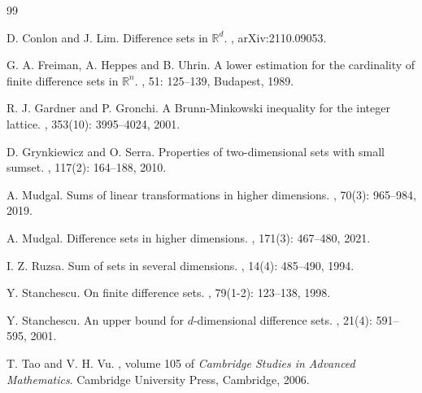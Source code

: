 \begin{thebibliography}{99}


D. Conlon and J. Lim.
\newblock Difference sets in $\mathbb{R}^d$.
, arXiv:2110.09053.


G. A. Freiman, A. Heppes and B. Uhrin.
\newblock A lower estimation for the cardinality of finite difference sets in $\mathbb{R}^n$.
, 51: 125--139, Budapest, 1989.


R. J. Gardner and P. Gronchi.
\newblock A Brunn-Minkowski inequality for the integer lattice.
, 353(10): 3995--4024, 2001.


D. Grynkiewicz and O. Serra.
\newblock Properties of two-dimensional sets with small sumset.
, 117(2): 164--188, 2010.


A. Mudgal.
\newblock Sums of linear transformations in higher dimensions.
, 70(3): 965--984, 2019.


A. Mudgal.
\newblock Difference sets in higher dimensions.
, 171(3): 467--480, 2021.


 I. Z. Ruzsa.
\newblock Sum of sets in several dimensions.
, 14(4): 485--490, 1994.


Y. Stanchescu.
\newblock On finite difference sets.
, 79(1-2): 123--138, 1998.


Y. Stanchescu.
\newblock An upper bound for $d$-dimensional difference sets.
, 21(4): 591--595, 2001.


T. Tao and V. H. Vu.
, volume 105 of {\em Cambridge Studies in Advanced Mathematics}. Cambridge University Press, Cambridge, 2006.



\end{thebibliography}
